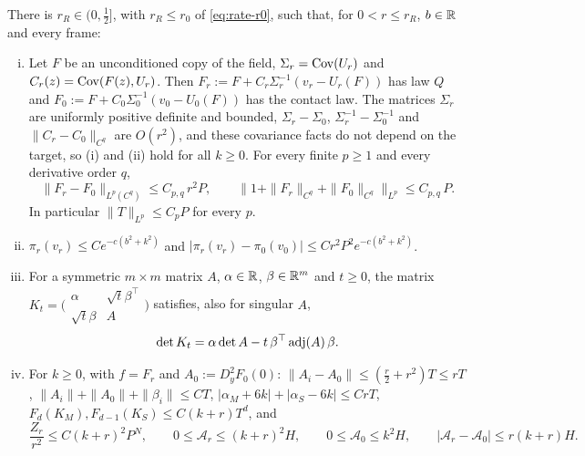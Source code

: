 \begin{proposition}\label{prop:remainder-R}
There is $r_R\in(0,\frac12]$, with $r_R\le r_0$ of \eqref{eq:rate-r0}, such that, for $0<r\le r_R$, $b\in\mathbb R$ and every frame:
\begin{enumerate}[(i),leftmargin=2em]
\item Let $F$ be an unconditioned copy of the field, $\Sigma_r=\operatorname{Cov}(U_r)$ and $C_r(z)=\operatorname{Cov}(F(z),U_r)$. Then $F_r:=F+C_r\Sigma_r^{-1}(v_r-U_r(F))$ has law $Q$ and $F_0:=F+C_0\Sigma_0^{-1}(v_0-U_0(F))$ has the contact law. The matrices $\Sigma_r$ are uniformly positive definite and bounded, $\Sigma_r-\Sigma_0$, $\Sigma_r^{-1}-\Sigma_0^{-1}$ and $\|C_r-C_0\|_{C^q}$ are $O(r^2)$, and these covariance facts do not depend on the target, so (i) and (ii) hold for all $k\ge0$. For every finite $p\ge1$ and every derivative order $q$,
\begin{equation}\label{eq:remainder-R4}
\|F_r-F_0\|_{L^p(C^q)}\le C_{p,q}\,r^2P,\qquad \bigl\|1+\|F_r\|_{C^q}+\|F_0\|_{C^q}\bigr\|_{L^p}\le C_{p,q}\,P .
\end{equation}
In particular $\|T\|_{L^p}\le C_pP$ for every $p$.
\item $\pi_r(v_r)\le Ce^{-c(b^2+k^2)}$ and $|\pi_r(v_r)-\pi_0(v_0)|\le Cr^2P^2e^{-c(b^2+k^2)}$.
\item For a symmetric $m\times m$ matrix $A$, $\alpha\in\mathbb R$, $\beta\in\mathbb R^m$ and $t\ge0$, the matrix $K_t=\bigl(\begin{smallmatrix}\alpha&\sqrt t\beta^{\top}\\ \sqrt t\beta&A\end{smallmatrix}\bigr)$ satisfies, also for singular $A$,
\begin{equation}\label{eq:remainder-block}
\det K_t=\alpha\det A-t\,\beta^{\top}\operatorname{adj}(A)\,\beta .
\end{equation}
\item For $k\ge0$, with $f=F_r$ and $A_0:=D_y^2F_0(0)$: $\|A_i-A_0\|\le(\frac r2+r^2)T\le rT$, $\|A_i\|+\|A_0\|+\|\beta_i\|\le CT$, $|\alpha_M+6k|+|\alpha_S-6k|\le CrT$, $F_d(K_M),F_{d-1}(K_S)\le C(k+r)T^d$, and
\begin{equation}\label{eq:remainder-R11}
\frac{Z_r}{r^2}\le C(k+r)^2P^N,\qquad 0\le\mathcal A_r\le(k+r)^2H,\qquad 0\le\mathcal A_0\le k^2H,\qquad |\mathcal A_r-\mathcal A_0|\le r(k+r)H .
\end{equation}
\end{enumerate}
\end{proposition}

